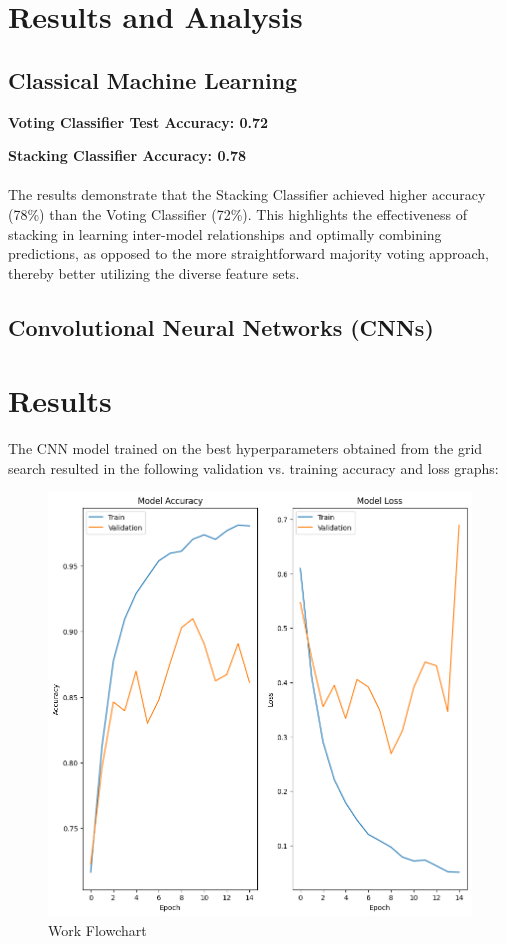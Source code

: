 \documentclass[10pt,twocolumn,letterpaper]{article}
\begin{document}
\section{Results and Analysis}

\subsection{Classical Machine Learning}

\textbf{Voting Classifier Test Accuracy: 0.72}

\textbf{Stacking Classifier Accuracy: 0.78}
\\\\
The results demonstrate that the Stacking Classifier achieved higher accuracy (78\%) than the Voting Classifier (72\%). This highlights the effectiveness of stacking in learning inter-model relationships and optimally combining predictions, as opposed to the more straightforward majority voting approach, thereby better utilizing the diverse feature sets.

\subsection{Convolutional Neural Networks (CNNs)}

\section*{Results}

The CNN model trained on the best hyperparameters obtained from the grid search resulted in the following validation vs. training accuracy and loss graphs:

\begin{figure}[H]
    \centering
    \includegraphics[scale=0.4]{8.png}
    \caption{Work Flowchart}
\end{figure}
\end{document}
